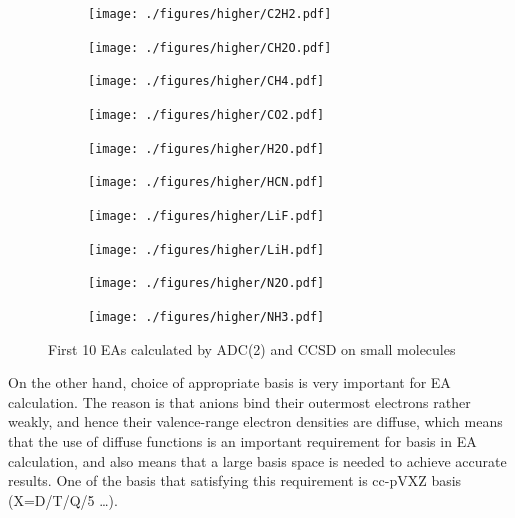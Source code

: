 \begin{figure}[ht]
	\centering
	\begin{subfigure}[b]{0.42\linewidth}
		\centering
		\texttt{[image: ./figures/higher/C2H2.pdf]}
	\end{subfigure}
	\begin{subfigure}[b]{0.42\linewidth}
		\centering
		\texttt{[image: ./figures/higher/CH2O.pdf]}
	\end{subfigure}
	\begin{subfigure}[b]{0.42\linewidth}
		\centering
		\texttt{[image: ./figures/higher/CH4.pdf]}
	\end{subfigure}
	\begin{subfigure}[b]{0.42\linewidth}
		\centering
		\texttt{[image: ./figures/higher/CO2.pdf]}
	\end{subfigure}
	\begin{subfigure}[b]{0.42\linewidth}
		\centering
		\texttt{[image: ./figures/higher/H2O.pdf]}
	\end{subfigure}
	\begin{subfigure}[b]{0.42\linewidth}
		\centering
		\texttt{[image: ./figures/higher/HCN.pdf]}
	\end{subfigure}
	\begin{subfigure}[b]{0.42\linewidth}
		\centering
		\texttt{[image: ./figures/higher/LiF.pdf]}
	\end{subfigure}
	\begin{subfigure}[b]{0.42\linewidth}
		\centering
		\texttt{[image: ./figures/higher/LiH.pdf]}
	\end{subfigure}
	\begin{subfigure}[b]{0.42\linewidth}
		\centering
		\texttt{[image: ./figures/higher/N2O.pdf]}
	\end{subfigure}
	\begin{subfigure}[b]{0.42\linewidth}
		\centering
		\texttt{[image: ./figures/higher/NH3.pdf]}
	\end{subfigure}
	\caption{First 10 EAs calculated by ADC(2) and CCSD on small molecules}
	\label{higher}
\end{figure}
On the other hand, choice of appropriate basis is very important for EA calculation.
The reason is that anions bind their outermost electrons rather weakly, and hence their valence-range electron densities are diffuse, which means that the use of diffuse functions is an important requirement for basis in EA calculation, and also means that a large basis space is needed to achieve accurate results. One of the basis that satisfying this requirement is cc-pVXZ basis (X=D/T/Q/5 \dots). \cite{newpaper}

